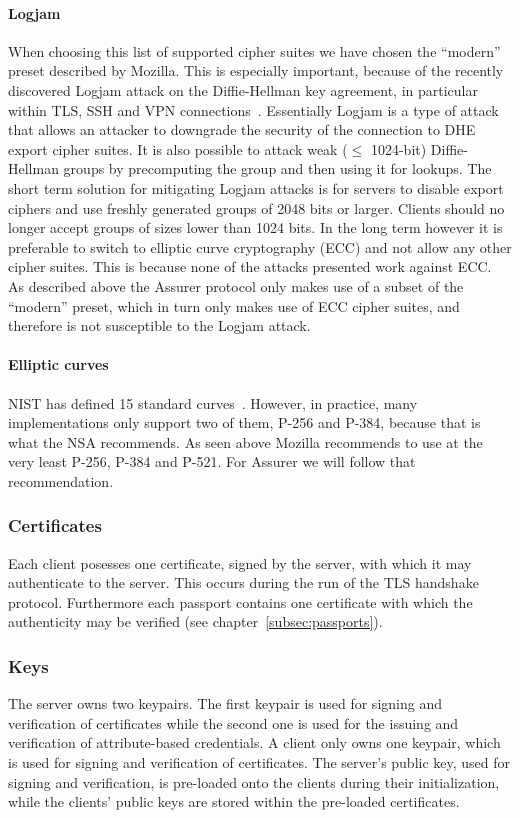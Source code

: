 \paragraph{Logjam}
When choosing this list of supported cipher suites we have chosen the ``modern'' preset described by Mozilla. This is especially important, because of the recently discovered Logjam attack on the Diffie-Hellman key agreement, in particular within TLS, SSH and VPN connections~\cite{logjam}. Essentially Logjam is a type of attack that allows an attacker to downgrade the security of the connection to DHE export cipher suites. It is also possible to attack weak ($\leq$ 1024-bit) Diffie-Hellman groups by precomputing the group and then using it for lookups. The short term solution for mitigating Logjam attacks is for servers to disable export ciphers and use freshly generated groups of 2048 bits or larger. Clients should no longer accept groups of sizes lower than 1024 bits. In the long term however it is preferable to switch to elliptic curve cryptography (ECC) and not allow any other cipher suites. This is because none of the attacks presented work against ECC. As described above the Assurer protocol only makes use of a subset of the ``modern'' preset, which in turn only makes use of ECC cipher suites, and therefore is not susceptible to the Logjam attack.

\paragraph{Elliptic curves}
NIST has defined 15 standard curves~\cite{dss}. However, in practice, many implementations only support two of them, P-256 and P-384, because that is what the NSA recommends. As seen above Mozilla recommends to use at the very least P-256, P-384 and P-521. For Assurer we will follow that recommendation.

\subsubsection{Certificates}
Each client posesses one certificate, signed by the server, with which it may authenticate to the server. This occurs during the run of the TLS handshake protocol. Furthermore each passport contains one certificate with which the authenticity may be verified (see chapter~\ref{subsec:passports}).

\subsubsection{Keys}
The server owns two keypairs. The first keypair is used for signing and verification of certificates while the second one is used for the issuing and verification of attribute-based credentials. A client only owns one keypair, which is used for signing and verification of certificates. The server's public key, used for signing and verification, is pre-loaded onto the clients during their initialization, while the clients' public keys are stored within the pre-loaded certificates.

